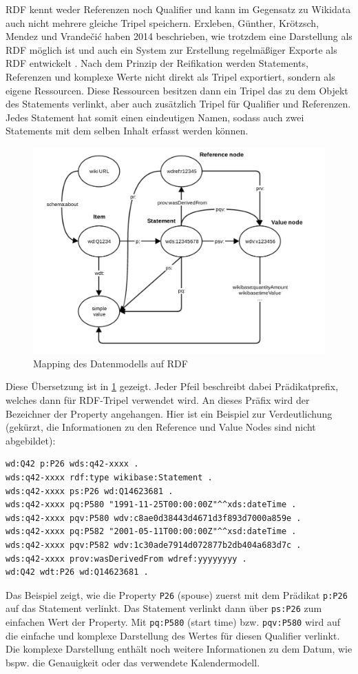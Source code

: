 RDF kennt weder Referenzen noch Qualifier und kann im Gegensatz zu Wikidata auch nicht mehrere gleiche Tripel speichern.
Erxleben, Günther, Krötzsch, Mendez und Vrandečić haben 2014 beschrieben, wie trotzdem eine Darstellung als RDF möglich ist und auch ein System zur Erstellung regelmäßiger Exporte als RDF entwickelt \cite{wikidata-rdf-export}.
Nach dem Prinzip der Reifikation werden Statements, Referenzen und komplexe Werte nicht direkt als Tripel exportiert, sondern als eigene Ressourcen. 
Diese Ressourcen besitzen dann ein Tripel das zu dem Objekt des Statements verlinkt, aber auch zusätzlich Tripel für Qualifier und Referenzen.
Jedes Statement hat somit einen eindeutigen Namen, sodass auch zwei Statements mit dem selben Inhalt erfasst werden können.
\begin{figure}
  \includegraphics[width=\linewidth]{pics/Rdf_mapping}
  \caption{Mapping des Datenmodells auf RDF}
  \label{fig:rdf-mapping}
\end{figure}

Diese Übersetzung ist in \cref{fig:rdf-mapping} gezeigt.
Jeder Pfeil beschreibt dabei Prädikatprefix, welches dann für RDF-Tripel verwendet wird.
An dieses Präfix wird der Bezeichner der Property angehangen.
Hier ist ein Beispiel zur Verdeutlichung (gekürzt, die Informationen zu den Reference und Value Nodes sind nicht abgebildet):
\begin{lstlisting}[language=SPARQL]
wd:Q42 p:P26 wds:q42-xxxx .
wds:q42-xxxx rdf:type wikibase:Statement .
wds:q42-xxxx ps:P26 wd:Q14623681 .
wds:q42-xxxx pq:P580 "1991-11-25T00:00:00Z"^^xds:dateTime .
wds:q42-xxxx pqv:P580 wdv:c8ae0d38443d4671d3f893d7000a859e .
wds:q42-xxxx pq:P582 "2001-05-11T00:00:00Z"^^xsd:dateTime .
wds:q42-xxxx pqv:P582 wdv:1c30ade7914d072877b2db404a683d7c .
wds:q42-xxxx prov:wasDerivedFrom wdref:yyyyyyyy .
wd:Q42 wdt:P26 wd:Q14623681 .
\end{lstlisting}
Das Beispiel zeigt, wie die Property \verb|P26| (spouse) zuerst mit dem Prädikat \verb|p:P26| auf das Statement verlinkt.
Das Statement verlinkt dann über \verb|ps:P26| zum einfachen Wert der Property.
Mit \verb|pq:P580| (start time) bzw. \verb|pqv:P580| wird auf die einfache und komplexe Darstellung des Wertes für diesen Qualifier verlinkt.
Die komplexe Darstellung enthält noch weitere Informationen zu dem Datum, wie bspw. die Genauigkeit oder das verwendete Kalendermodell.

